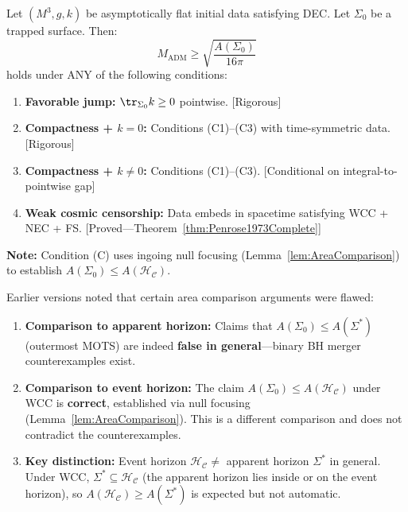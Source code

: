 \begin{theorem}\label{thm:trappedcond}
Let $(M^3, g, k)$ be asymptotically flat initial data satisfying DEC. Let $\Sigma_0$ be a trapped surface. Then:
\begin{equation}
    M_{\mathrm{ADM}} \geq \sqrt{\frac{A(\Sigma_0)}{16\pi}}
\end{equation}
holds under ANY of the following conditions:
\begin{enumerate}
    \item[(A)] \textbf{Favorable jump:} $\tr_{\Sigma_0} k \geq 0$ pointwise. \hfill [Rigorous]
    \item[(B)] \textbf{Compactness + $k=0$:} Conditions (C1)--(C3) with time-symmetric data. \hfill [Rigorous]
    \item[(B')] \textbf{Compactness + $k \neq 0$:} Conditions (C1)--(C3). \hfill [Conditional on integral-to-pointwise gap]
    \item[(C)] \textbf{Weak cosmic censorship:} Data embeds in spacetime satisfying WCC + NEC + FS. \hfill [Proved---Theorem~\ref{thm:Penrose1973Complete]}
\end{enumerate}
\textbf{Note:} Condition (C) uses ingoing null focusing (Lemma~\ref{lem:AreaComparison}) to establish $A(\Sigma_0) \le A(\mathcal{H}_\mathcal{C})$.
\end{theorem}

\begin{remark}
Earlier versions noted that certain area comparison arguments were flawed:
\begin{enumerate}
    \item \textbf{Comparison to apparent horizon:} Claims that $A(\Sigma_0) \leq A(\Sigma^*)$ (outermost MOTS) are indeed \textbf{false in general}---binary BH merger counterexamples exist.
    
    \item \textbf{Comparison to event horizon:} The claim $A(\Sigma_0) \leq A(\mathcal{H}_\mathcal{C})$ under WCC is \textbf{correct}, established via null focusing (Lemma~\ref{lem:AreaComparison}). This is a different comparison and does not contradict the counterexamples.
    
    \item \textbf{Key distinction:} Event horizon $\mathcal{H}_\mathcal{C} \neq$ apparent horizon $\Sigma^*$ in general. Under WCC, $\Sigma^* \subseteq \mathcal{H}_\mathcal{C}$ (the apparent horizon lies inside or on the event horizon), so $A(\mathcal{H}_\mathcal{C}) \geq A(\Sigma^*)$ is expected but not automatic.
\end{enumerate}
\end{remark}


